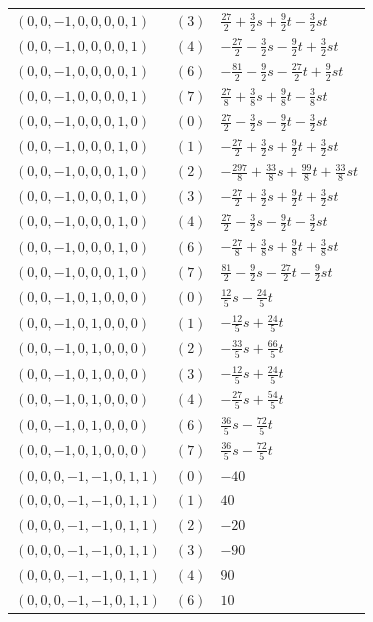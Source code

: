 \begin{longtable}{@{}lll@{}}
$(0,0,-1,0,0,0,0,1)$ & $(3)$ & $\frac{27}{2}+\frac{3}{2}s+\frac{9}{2}t-\frac{3}{2}st$\\
$(0,0,-1,0,0,0,0,1)$ & $(4)$ & $-\frac{27}{2}-\frac{3}{2}s-\frac{9}{2}t+\frac{3}{2}st$\\
$(0,0,-1,0,0,0,0,1)$ & $(6)$ & $-\frac{81}{2}-\frac{9}{2}s-\frac{27}{2}t+\frac{9}{2}st$\\
$(0,0,-1,0,0,0,0,1)$ & $(7)$ & $\frac{27}{8}+\frac{3}{8}s+\frac{9}{8}t-\frac{3}{8}st$\\
$(0,0,-1,0,0,0,1,0)$ & $(0)$ & $\frac{27}{2}-\frac{3}{2}s-\frac{9}{2}t-\frac{3}{2}st$\\
$(0,0,-1,0,0,0,1,0)$ & $(1)$ & $-\frac{27}{2}+\frac{3}{2}s+\frac{9}{2}t+\frac{3}{2}st$\\
$(0,0,-1,0,0,0,1,0)$ & $(2)$ & $-\frac{297}{8}+\frac{33}{8}s+\frac{99}{8}t+\frac{33}{8}st$\\
$(0,0,-1,0,0,0,1,0)$ & $(3)$ & $-\frac{27}{2}+\frac{3}{2}s+\frac{9}{2}t+\frac{3}{2}st$\\
$(0,0,-1,0,0,0,1,0)$ & $(4)$ & $\frac{27}{2}-\frac{3}{2}s-\frac{9}{2}t-\frac{3}{2}st$\\
$(0,0,-1,0,0,0,1,0)$ & $(6)$ & $-\frac{27}{8}+\frac{3}{8}s+\frac{9}{8}t+\frac{3}{8}st$\\
$(0,0,-1,0,0,0,1,0)$ & $(7)$ & $\frac{81}{2}-\frac{9}{2}s-\frac{27}{2}t-\frac{9}{2}st$\\
$(0,0,-1,0,1,0,0,0)$ & $(0)$ & $\frac{12}{5}s-\frac{24}{5}t$\\
$(0,0,-1,0,1,0,0,0)$ & $(1)$ & $-\frac{12}{5}s+\frac{24}{5}t$\\
$(0,0,-1,0,1,0,0,0)$ & $(2)$ & $-\frac{33}{5}s+\frac{66}{5}t$\\
$(0,0,-1,0,1,0,0,0)$ & $(3)$ & $-\frac{12}{5}s+\frac{24}{5}t$\\
$(0,0,-1,0,1,0,0,0)$ & $(4)$ & $-\frac{27}{5}s+\frac{54}{5}t$\\
$(0,0,-1,0,1,0,0,0)$ & $(6)$ & $\frac{36}{5}s-\frac{72}{5}t$\\
$(0,0,-1,0,1,0,0,0)$ & $(7)$ & $\frac{36}{5}s-\frac{72}{5}t$\\
$(0,0,0,-1,-1,0,1,1)$ & $(0)$ & $-40$\\
$(0,0,0,-1,-1,0,1,1)$ & $(1)$ & $40$\\
$(0,0,0,-1,-1,0,1,1)$ & $(2)$ & $-20$\\
$(0,0,0,-1,-1,0,1,1)$ & $(3)$ & $-90$\\
$(0,0,0,-1,-1,0,1,1)$ & $(4)$ & $90$\\
$(0,0,0,-1,-1,0,1,1)$ & $(6)$ & $10$\\

\end{longtable}
